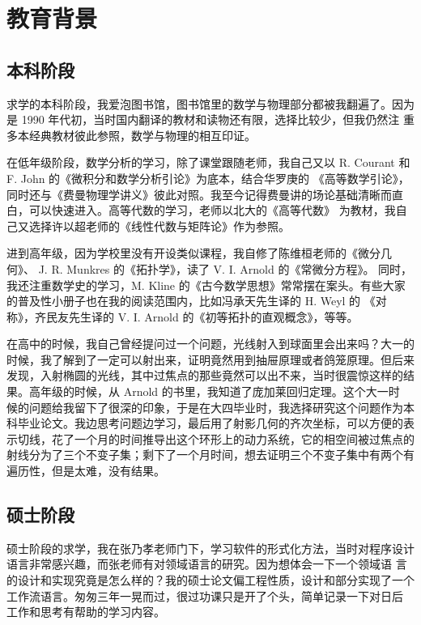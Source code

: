 \documentclass[a4paper,12pt]{article}
\numberwithin{problem}{section}
\numberwithin{definition}{section}
\numberwithin{lemma}{section}
\numberwithin{proposition}{section}
\numberwithin{theorem}{section}
\numberwithin{grammar}{section}
\numberwithin{program}{section}
\numberwithin{convention}{section}
\numberwithin{corollary}{section}
\begin{document}
\section{教育背景}

\subsection{本科阶段}

求学的本科阶段，我爱泡图书馆，图书馆里的数学与物理部分都被我翻遍了。因为是 1990 年代初，当时国内翻译的教材和读物还有限，选择比较少，但我仍然注
重多本经典教材彼此参照，数学与物理的相互印证。

在低年级阶段，数学分析的学习，除了课堂跟随老师，我自己又以 R. Courant 和 F. John 的《微积分和数学分析引论》为底本，结合华罗庚的
《高等数学引论》，同时还与《费曼物理学讲义》彼此对照。我至今记得费曼讲的场论基础清晰而直白，可以快速进入。高等代数的学习，老师以北大的《高等代数》
为教材，我自己又选择许以超老师的《线性代数与矩阵论》作为参照。

进到高年级，因为学校里没有开设类似课程，我自修了陈维桓老师的《微分几何》、 J. R. Munkres 的《拓扑学》，读了 V. I. Arnold 的《常微分方程》。
同时，我还注重数学史的学习，M. Kline 的《古今数学思想》常常摆在案头。有些大家的普及性小册子也在我的阅读范围内，比如冯承天先生译的 H. Weyl 的
《对称》，齐民友先生译的 V. I. Arnold 的《初等拓扑的直观概念》，等等。

在高中的时候，我自己曾经提问过一个问题，光线射入到球面里会出来吗？大一的时候，我了解到了一定可以射出来，证明竟然用到抽屉原理或者鸽笼原理。但后来
发现，入射椭圆的光线，其中过焦点的那些竟然可以出不来，当时很震惊这样的结果。高年级的时候，从 Arnold 的书里，我知道了庞加莱回归定理。这个大一时
候的问题给我留下了很深的印象，于是在大四毕业时，我选择研究这个问题作为本科毕业论文。我边思考问题边学习，最后用了射影几何的齐次坐标，可以方便的表
示切线，花了一个月的时间推导出这个环形上的动力系统，它的相空间被过焦点的射线分为了三个不变子集；剩下了一个月时间，想去证明三个不变子集中有两个有
遍历性，但是太难，没有结果。

\subsection{硕士阶段}

硕士阶段的求学，我在张乃孝老师门下，学习软件的形式化方法，当时对程序设计语言非常感兴趣，而张老师有对领域语言的研究。因为想体会一下一个领域语
言的设计和实现究竟是怎么样的？我的硕士论文偏工程性质，设计和部分实现了一个工作流语言。匆匆三年一晃而过，很过功课只是开了个头，简单记录一下对日后
工作和思考有帮助的学习内容。
\end{document}
